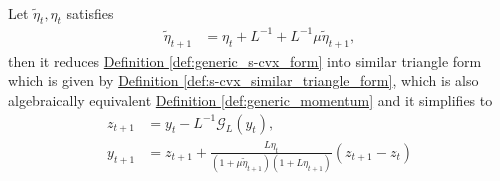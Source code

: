 \documentclass[12pt]{article}
\begin{document}
        \begin{theorem}
        \label{thm:momentum_is_similar_triangle}
            \;\\
            Let $\tilde \eta_t, \eta_t$
            satisfies 
            \begin{align*}
                \tilde\eta_{t + 1} &= \eta_t + L^{-1} + L^{-1} \mu \tilde\eta_{t + 1},
            \end{align*}
            then it reduces 
            \hyperref[def:generic_s-cvx_form]{Definition \ref*{def:generic_s-cvx_form}}
            into similar triangle form which is given by 
            \hyperref[def:s-cvx_similar_triangle_form]
            {Definition \ref*{def:s-cvx_similar_triangle_form}}, 
            which is also algebraically equivalent 
            \hyperref[def:generic_momentum]{Definition \ref*{def:generic_momentum}}
            and it simplifies to
            \begin{align*}
                z_{t + 1} &= y_t - L^{-1}\mathcal G_L(y_t), 
                \\
                y_{t + 1} &= z_{t + 1} + 
                \frac{L\eta_t}{(1 + \mu \tilde\eta_{t + 1})(1 + L\eta_{t + 1})}(z_{t + 1} - z_t)
            \end{align*}
        \end{theorem}
\end{document}
